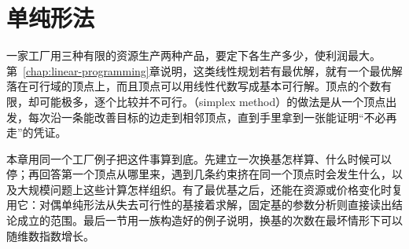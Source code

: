 \chapter{单纯形法}
\label{chap:simplex-method}

一家工厂用三种有限的资源生产两种产品，要定下各生产多少，使利润最大。第~\ref{chap:linear-programming}章说明，这类线性规划若有最优解，就有一个最优解落在可行域的顶点上，而且顶点可以用线性代数写成基本可行解。顶点的个数有限，却可能极多，逐个比较并不可行。（simplex method）的做法是从一个顶点出发，每次沿一条能改善目标的边走到相邻顶点，直到手里拿到一张能证明“不必再走”的凭证。

本章用同一个工厂例子把这件事算到底。先建立一次换基怎样算、什么时候可以停；再回答第一个顶点从哪里来，遇到几条约束挤在同一个顶点时会发生什么，以及大规模问题上这些计算怎样组织。有了最优基之后，还能在资源或价格变化时复用它：对偶单纯形法从失去可行性的基接着求解，固定基的参数分析则直接读出结论成立的范围。最后一节用一族构造好的例子说明，换基的次数在最坏情形下可以随维数指数增长。









